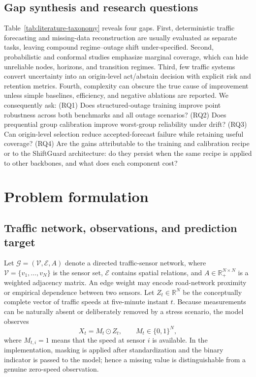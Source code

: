 \documentclass[preprint,12pt]{elsarticle}
\begin{document}
\subsection{Gap synthesis and research questions}
Table~\ref{tab:literature-taxonomy} reveals four gaps. First, deterministic
traffic forecasting and missing-data reconstruction are usually evaluated as
separate tasks, leaving compound regime--outage shift under-specified. Second,
probabilistic and conformal studies emphasize marginal coverage, which can hide
unreliable nodes, horizons, and transition regimes. Third, few traffic systems
convert uncertainty into an origin-level act/abstain decision with explicit
risk and retention metrics. Fourth, complexity can obscure the true cause of
improvement unless simple baselines, efficiency, and negative ablations are
reported. We consequently ask: (RQ1) Does structured-outage training improve
point robustness across both benchmarks and all outage scenarios? (RQ2)
Does prequential group calibration improve worst-group reliability under
drift? (RQ3) Can origin-level selection reduce accepted-forecast failure while
retaining useful coverage? (RQ4) Are the gains attributable to the training
and calibration recipe or to the ShiftGuard architecture: do they persist when
the same recipe is applied to other backbones, and what does each component
cost?

\section{Problem formulation}
\subsection{Traffic network, observations, and prediction target}
Let $\mathcal{G}=(\mathcal{V},\mathcal{E},A)$ denote a directed traffic-sensor
network, where $\mathcal{V}=\{v_1,\ldots,v_N\}$ is the sensor set,
$\mathcal{E}$ contains spatial relations, and $A\in\mathbb{R}_{+}^{N\times N}$
is a weighted adjacency matrix. An edge weight may encode road-network
proximity or empirical dependence between two sensors. Let
$Z_t\in\mathbb{R}^{N}$ be the conceptually complete vector of traffic speeds at
five-minute instant $t$. Because measurements can be naturally absent or
deliberately removed by a stress scenario, the model observes
\begin{equation}
 X_t=M_t\odot Z_t, \qquad M_t\in\{0,1\}^{N},
 \label{eq:masked-observation}
\end{equation}
where $M_{t,i}=1$ means that the speed at sensor $i$ is available. In the
implementation, masking is applied after standardization and the binary
indicator is passed to the model; hence a missing value is distinguishable
from a genuine zero-speed observation.
\end{document}
